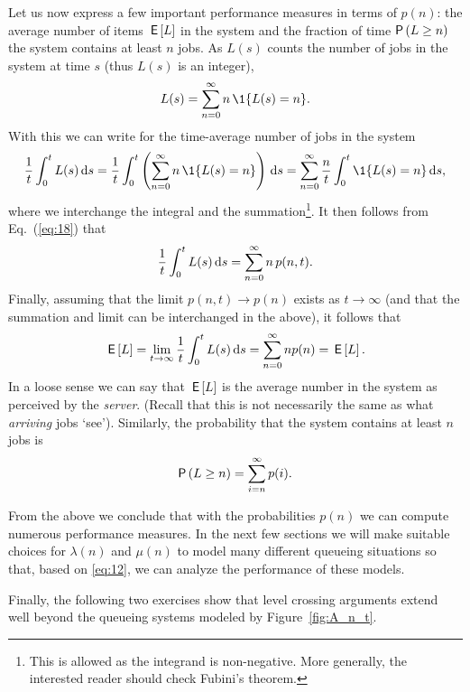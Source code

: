 Let us now express a few important performance measures in terms of
$p(n)$: the average number of items $\,\mathsf{E}\left[L\right]$ in the system and the
fraction of time $\P{L\geq n}$ the system contains at least $n$ jobs.
As $L(s)$ counts the number of jobs in the system at time $s$ (thus
$L(s)$ is an integer),
\begin{equation*}
  L(s) = \sum_{n=0}^\infty n\, \1{L(s) = n}.
\end{equation*}
With this we can write for the time-average number of jobs in the system
\begin{equation}\label{eq:1}
\frac 1 t \int_0^t L(s) \d s = \frac 1 t \int_0^t \left(\sum_{n=0}^{\infty} n\, \1{L(s) = n}\right) \d s
= \sum_{n=0}^{\infty} \frac n t \int_0^t   \1{L(s) = n} \d s,
\end{equation}
where we interchange the integral and the summation\footnote{This is
  allowed as the integrand is non-negative. More generally, the
  interested reader should check Fubini's theorem.}.  It then follows
  from Eq.~(\ref{eq:18}) that
\begin{equation*}
\frac 1 t \int_0^t L(s) \,\text{d}s =  \sum_{n=0}^{\infty} n\, p(n,t).
\end{equation*}
Finally, assuming that the limit $p(n,t) \to p(n)$ exists as
$t\to\infty$ (and that the summation and limit can be interchanged in
the above), it follows that 
\begin{equation*}
\,\mathsf{E}\left[L\right] = \lim_{t\to\infty} \frac 1 t \int_0^t L(s) \,\text{d}s = \sum_{n=0}^\infty n p(n) = \,\mathsf{E}\left[L\right].
\end{equation*}
In a loose sense we can say that
$\,\mathsf{E}\left[L\right]$ is the average number in the system as perceived by the
\emph{server}. (Recall that this is not necessarily the same as what
\emph{arriving} jobs `see').  Similarly, the probability that the
system contains at least $n$ jobs is 
\begin{equation*}
  \P{ L \geq n} = \sum_{i=n}^\infty p(i).
\end{equation*}

From the above we conclude that with the probabilities $p(n)$ we can compute numerous performance measures.
In the next few sections we will make suitable choices for $\lambda(n)$ and $\mu(n)$ to model many different queueing situations so that, based on \eqref{eq:12}, we can analyze the performance of these models.




Finally, the following two exercises show that level crossing arguments extend well beyond the queueing systems modeled by Figure~\ref{fig:A_n_t}.

